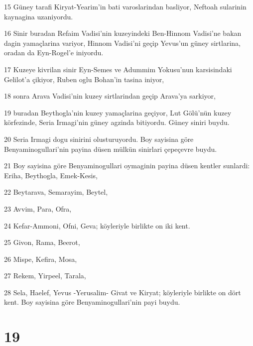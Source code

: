 \par 15 Güney tarafi Kiryat-Yearim'in bati varoslarindan basliyor, Neftoah sularinin kaynagina uzaniyordu.
\par 16 Sinir buradan Refaim Vadisi'nin kuzeyindeki Ben-Hinnom Vadisi'ne bakan dagin yamaçlarina variyor, Hinnom Vadisi'ni geçip Yevus'un güney sirtlarina, oradan da Eyn-Rogel'e iniyordu.
\par 17 Kuzeye kivrilan sinir Eyn-Semes ve Adummim Yokusu'nun karsisindaki Gelilot'a çikiyor, Ruben oglu Bohan'in tasina iniyor,
\par 18 sonra Arava Vadisi'nin kuzey sirtlarindan geçip Arava'ya sarkiyor,
\par 19 buradan Beythogla'nin kuzey yamaçlarina geçiyor, Lut Gölü'nün kuzey körfezinde, Seria Irmagi'nin güney agzinda bitiyordu. Güney siniri buydu.
\par 20 Seria Irmagi dogu sinirini olusturuyordu. Boy sayisina göre Benyaminogullari'nin payina düsen mülkün sinirlari çepeçevre buydu.
\par 21 Boy sayisina göre Benyaminogullari oymaginin payina düsen kentler sunlardi: Eriha, Beythogla, Emek-Kesis,
\par 22 Beytarava, Semarayim, Beytel,
\par 23 Avvim, Para, Ofra,
\par 24 Kefar-Ammoni, Ofni, Geva; köyleriyle birlikte on iki kent.
\par 25 Givon, Rama, Beerot,
\par 26 Mispe, Kefira, Mosa,
\par 27 Rekem, Yirpeel, Tarala,
\par 28 Sela, Haelef, Yevus -Yerusalim- Givat ve Kiryat; köyleriyle birlikte on dört kent. Boy sayisina göre Benyaminogullari'nin payi buydu.

\chapter{19}

